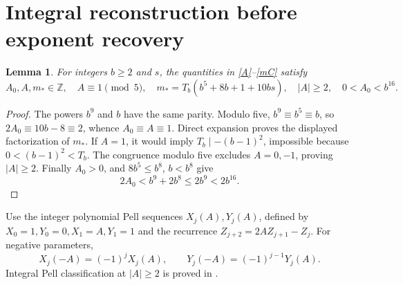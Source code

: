 \documentclass[11pt]{article}
\newtheorem{lemma}[theorem]{Lemma}
\newcommand{\Z}{\mathbb Z}\newcommand{\Q}{\mathbb Q}
\begin{document}
\section{Integral reconstruction before exponent recovery}

\begin{lemma}\label{parameter}
For integers \(b\ge2\) and \(s\), the quantities in
\eqref{A}--\eqref{mC} satisfy
\[
 A_0,A,m_*\in\Z,\quad A\equiv1\pmod5,\quad
 m_*=T_b(b^5+8b+1+10bs),\quad |A|\ge2,\quad 0<A_0<b^{16}.
\]
\end{lemma}
\begin{proof}
The powers \(b^9\) and \(b\) have the same parity.
Modulo five, \(b^9\equiv b^5\equiv b\), so
\(2A_0\equiv10b-8\equiv2\), whence \(A_0\equiv A\equiv1\).
Direct expansion proves the displayed factorization of \(m_*\).
If \(A=1\), it would imply \(T_b\mid-(b-1)^2\), impossible
because \(0<(b-1)^2<T_b\). The congruence modulo five excludes
\(A=0,-1\), proving \(|A|\ge2\).
Finally \(A_0>0\), and \(8b^5\le b^8\), \(b<b^8\) give
\[
       2A_0<b^9+2b^8\le2b^9<2b^{16}.
\]
\end{proof}

Use the integer polynomial Pell sequences \(X_j(A),Y_j(A)\),
defined by \(X_0=1,Y_0=0,X_1=A,Y_1=1\) and the recurrence
\(Z_{j+2}=2AZ_{j+1}-Z_j\). For negative parameters,
\[
 X_j(-A)=(-1)^jX_j(A),\qquad
 Y_j(-A)=(-1)^{j-1}Y_j(A).
\]
Integral Pell classification at \(|A|\ge2\) is proved in
\cite{Index}.
\end{document}
